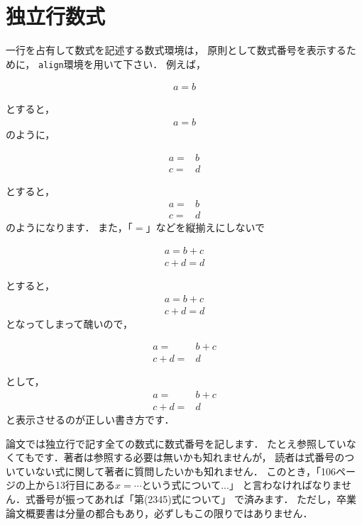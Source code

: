 \documentclass[a4j,12pt,dvipdfmx,oneside]{jsbook}
\theoremstyle{definition}
\begin{document}
\section{独立行数式}\label{sec:math_displaystyle}
%
%
%
一行を占有して数式を記述する数式環境は，
原則として数式番号を表示するために，
\texttt{align}環境を用いて下さい．
例えば，
\begin{verbatimtab}
\begin{align}
a=b
\end{align}
\end{verbatimtab}
とすると，
\begin{align}
a=b
\end{align}
のように，
\begin{verbatimtab}
\begin{align}
a=&b\\
c=&d
\end{align}
\end{verbatimtab}
とすると，
\begin{align}
a=&b\\
c=&d
\end{align}
のようになります．
また，「$=$」などを縦揃えにしないで
\begin{verbatimtab}
\begin{align}
a=b+c\\
c+d=d
\end{align}
\end{verbatimtab}
とすると，
\begin{align}
a=b+c\\
c+d=d
\end{align}
となってしまって醜いので，
\begin{verbatimtab}
\begin{align}
a=&b+c\\
c+d=&d
\end{align}
\end{verbatimtab}
として，
\begin{align}
a=&b+c\\
c+d=&d
\end{align}
と表示させるのが正しい書き方です．

論文では独立行で記す全ての数式に数式番号を記します．
たとえ参照していなくてもです．著者は参照する必要は無いかも知れませんが，
読者は式番号のついていない式に関して著者に質問したいかも知れません．
このとき，「106ページの上から13行目にある$x=\cdots$という式について...」
と言わなければなりません．式番号が振ってあれば「第(2345)式について」
で済みます．
ただし，卒業論文概要書は分量の都合もあり，必ずしもこの限りではありません．
\end{document}
